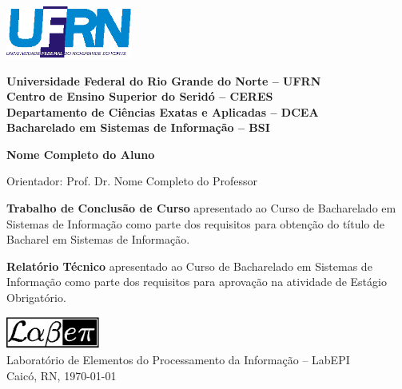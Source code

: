 \begin{titlepage}

\begin{center}

\small

\parbox{0.33\textwidth}{%
\includegraphics[width=0.31\textwidth]{image/ufrn.eps}}%
\parbox{0.67\textwidth}{%
\begin{center}%
\textbf{%
Universidade Federal do Rio Grande do Norte -- UFRN\\
Centro de Ensino Superior do Seridó -- CERES\\
Departamento de Ciências Exatas e Aplicadas -- DCEA\\
Bacharelado em Sistemas de Informação -- BSI}
\end{center}}

\vfill

\LARGE

\textbf{\titulo}

\vfill

\Large

\textbf{Nome Completo do Aluno}

\vfill

\normalsize

Orientador: Prof. Dr. Nome Completo do Professor

\vfill

\hfill
\if\doctype\doctypem           %
\parbox{0.5\linewidth}{%
{\bf Trabalho de Conclusão de Curso} apresentado ao Curso de Bacharelado em
Sistemas de Informação como parte dos requisitos para obtenção do título de
Bacharel em Sistemas de Informação.}
\fi
\if\doctype\doctyper           %
\parbox{0.5\linewidth}{%
{\bf Relatório Técnico} apresentado ao Curso de Bacharelado em Sistemas de
Informação como parte dos requisitos para aprovação na atividade de Estágio
Obrigatório.}
\fi

\vfill

\large

\includegraphics[width=0.23\textwidth]{image/labepi.eps} \\
Laboratório de Elementos do Processamento da Informação -- LabEPI \\
Caicó, RN, \today

\end{center}

\end{titlepage}
